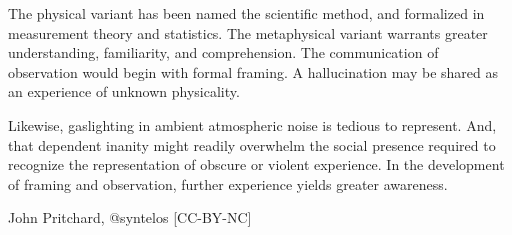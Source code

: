 The physical variant has been named the scientific method, and
formalized in measurement theory and statistics.  The metaphysical
variant warrants greater understanding, familiarity, and
comprehension.  The communication of observation would begin with
formal framing.  A hallucination may be shared as an experience of
unknown physicality.

Likewise, gaslighting in ambient atmospheric noise is tedious to
represent.  And, that dependent inanity might readily overwhelm the
social presence required to recognize the representation of obscure or
violent experience.  In the development of framing and observation,
further experience yields greater awareness.

\bigskip
{\tail John Pritchard, @syntelos [CC-BY-NC]}

\bye
